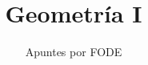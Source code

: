 \normalfont

\author{\Large Apuntes por FODE}
\title{Geometría I \\}
\date{}
\pagestyle{empty}
\maketitle
\thispagestyle{empty}
\let\cleardoublepage\clearpage
\tableofcontents 								%

\sffamily

 
\let\cleardoublepage\clearpage
